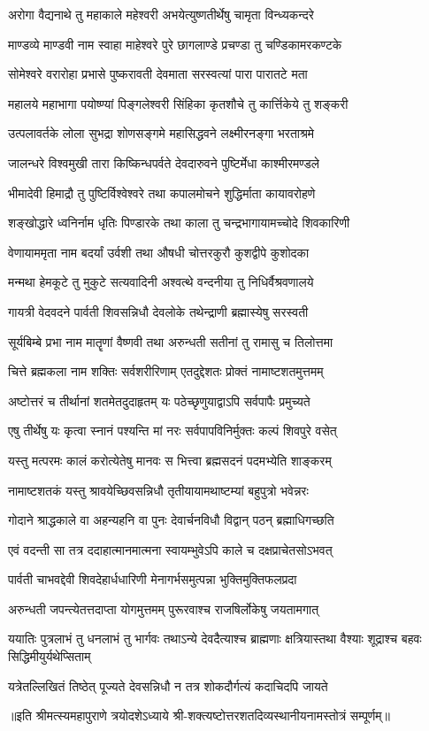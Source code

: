 \twolineshloka
{अरोगा वैद्यनाथे तु महाकाले महेश्वरी}
{अभयेत्युष्णतीर्थेषु चामृता विन्ध्यकन्दरे}

\twolineshloka
{माण्डव्ये माण्डवी नाम स्वाहा माहेश्वरे पुरे}
{छागलाण्डे प्रचण्डा तु चण्डिकामरकण्टके}

\twolineshloka
{सोमेश्वरे वरारोहा प्रभासे पुष्करावती}
{देवमाता सरस्वत्यां पारा पारातटे मता}

\twolineshloka
{महालये महाभागा पयोष्ण्यां पिङ्गलेश्वरी}
{सिंहिका कृतशौचे तु कार्त्तिकेये तु शङ्करी}

\twolineshloka
{उत्पलावर्तके लोला सुभद्रा शोणसङ्गमे}
{महासिद्धवने लक्ष्मीरनङ्गा भरताश्रमे}

\twolineshloka
{जालन्धरे विश्वमुखी तारा किष्किन्धपर्वते}
{देवदारुवने पुष्टिर्मेधा काश्मीरमण्डले}

\twolineshloka
{भीमादेवी हिमाद्रौ तु पुष्टिर्विश्वेश्वरे तथा}
{कपालमोचने शुद्धिर्माता कायावरोहणे}

\twolineshloka
{शङ्खोद्धारे ध्वनिर्नाम धृतिः पिण्डारके तथा}
{काला तु चन्द्रभागायामच्चोदे शिवकारिणी}

\twolineshloka
{वेणायाममृता नाम बदर्यां उर्वशी तथा}
{औषधी चोत्तरकुरौ कुशद्वीपे कुशोदका}

\twolineshloka
{मन्मथा हेमकूटे तु मुकुटे सत्यवादिनी}
{अश्वत्थे वन्दनीया तु निधिर्वैश्रवणालये}

\twolineshloka
{गायत्री वेदवदने पार्वती शिवसन्निधौ}
{देवलोके तथेन्द्राणी ब्रह्मास्येषु सरस्वती}

\twolineshloka
{सूर्यबिम्बे प्रभा नाम मातॄणां वैष्णवी तथा}
{अरुन्धती सतीनां तु रामासु च तिलोत्तमा}

\twolineshloka
{चित्ते ब्रह्मकला नाम शक्तिः सर्वशरीरिणाम्}
{एतदुद्देशतः प्रोक्तं नामाष्टशतमुत्तमम्}

\twolineshloka
{अष्टोत्तरं च तीर्थानां शतमेतदुदाहृतम्}
{यः पठेच्छृणुयाद्वाऽपि सर्वपापैः प्रमुच्यते}

\twolineshloka
{एषु तीर्थेषु यः कृत्वा स्नानं पश्यन्ति मां नरः}
{सर्वपापविनिर्मुक्तः कल्पं शिवपुरे वसेत्}

\twolineshloka
{यस्तु मत्परमः कालं करोत्येतेषु मानवः}
{स भित्त्वा ब्रह्मसदनं पदमभ्येति शाङ्करम्}

\twolineshloka
{नामाष्टशतकं यस्तु श्रावयेच्छिवसन्निधौ}
{तृतीयायामथाष्टम्यां बहुपुत्रो भवेन्नरः}

\twolineshloka
{गोदाने श्राद्धकाले वा अहन्यहनि वा पुनः}
{देवार्चनविधौ विद्वान् पठन् ब्रह्माधिगच्छति}

\twolineshloka
{एवं वदन्ती सा तत्र ददाहात्मानमात्मना}
{स्वायम्भुवेऽपि काले च दक्षप्राचेतसोऽभवत्}

\twolineshloka
{पार्वती चाभवद्देवी शिवदेहार्धधारिणी}
{मेनागर्भसमुत्पन्ना भुक्तिमुक्तिफलप्रदा}

\twolineshloka
{अरुन्धती जपन्त्येतत्तदाप्ता योगमुत्तमम्}
{पुरूरवाश्च राजषिर्लोकेषु जयतामगात्}

\threelineshloka
{ययातिः पुत्रलाभं तु धनलाभं तु भार्गवः}
{तथाऽन्ये देवदैत्याश्च ब्राह्मणाः क्षत्रियास्तथा}
{वैश्याः शूद्राश्च बहवः सिद्धिमीयुर्यथेप्सिताम्}

\twolineshloka
{यत्रेतल्लिखितं तिष्ठेत् पूज्यते देवसन्निधौ}
{न तत्र शोकदौर्गत्यं कदाचिदपि जायते}

॥इति श्रीमत्स्यमहापुराणे त्रयोदशेऽध्याये श्री-शक्त्यष्टोत्तरशतदिव्यस्थानीयनामस्तोत्रं सम्पूर्णम्॥